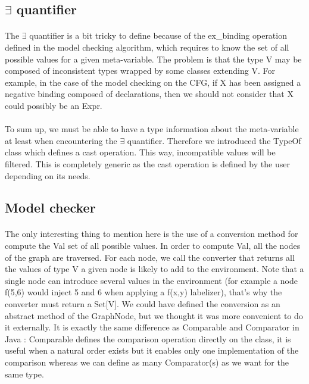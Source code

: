 \documentclass{report}
\begin{document}
\subsection* {$\exists$ quantifier}
\paragraph{}
\hspace{4mm}The $\exists$ quantifier is a bit tricky to define because of the ex\_binding operation defined in the model checking algorithm, which requires
to know the set of all possible values for a given meta-variable. The problem is that the type V may be composed of inconsistent types wrapped by some classes extending V. For example, in the case of the model checking on the CFG,
if X has been assigned a negative binding composed of declarations, then we should not consider that X could possibly be an Expr.

\paragraph{}
\hspace{4mm}To sum up, we must be able to have a type information about the meta-variable at least when encountering the $\exists$ quantifier. Therefore
we introduced the TypeOf class which defines a cast operation. This way, incompatible values will be filtered. This is completely generic as the cast operation is defined by the user depending on its needs.

\subsection{Model checker}

\paragraph{}
\hspace{4mm}The only interesting thing to mention here is the use of a conversion method for compute the Val set of all possible values.
In order to compute Val, all the nodes of the graph are traversed. For each node, we call the converter that returns all the values of type V a given node is likely to add to the environment. Note that 
a single node can introduce several values in the environment (for example a node f(5,6) would inject 5 and 6 when applying a f(x,y) labelizer), that's why the converter must return a Set[V]. We could have defined
the conversion as an abstract method of the GraphNode, but we thought it was more convenient to do it externally. It is exactly the same difference as
Comparable and Comparator in Java : Comparable defines the comparison operation directly on the class, it is useful when a natural order exists but it enables only one implementation
of the comparison whereas we can define as many Comparator(s) as we want for the same type.
\end{document}
